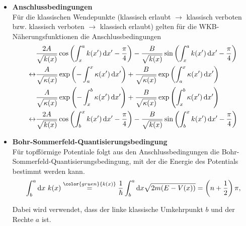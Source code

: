 \documentclass{article}
\newcommand{\diff}{\mathrm{d}}
\newcommand{\lr}[1]{\left(#1\right)}
\newcommand{\comment}[1]{{\color{gruen} {#1}}}
\begin{document}
	\begin{itemize}
		\item \textbf{Anschlussbedingungen}\\
		Für die klassischen Wendepunkte (klassisch erlaubt $\rightarrow$ klassisch verboten bzw. klassisch verboten $\rightarrow$ klassisch erlaubt) gelten für die WKB-Näherungsfunktionen die Anschlussbedingungen
			\begin{align}
				& \frac{2A}{\sqrt{k(x)}} \cos\lr{ \int_x^a k(x')\,\diff x' - \frac{\pi}{4} } - \frac{B}{\sqrt{k(x)}} \sin\lr{ \int_x^a k(x')\,\diff x' - \frac{\pi}{4} } \notag\\
				\leftrightarrow & \frac{A}{\sqrt{\kappa(x)}} \exp\lr{ -\int_a^x \kappa(x')\,\diff x' } + \frac{B}{\sqrt{\kappa(x)}} \exp\lr{ \int_a^x \kappa(x')\,\diff x' }\\
				& \frac{A}{\sqrt{\kappa(x)}} \exp\lr{ -\int_x^b \kappa(x')\,\diff x' } + \frac{B}{\sqrt{\kappa(x)}} \exp\lr{ \int_x^b \kappa(x')\,\diff x' } \notag \\
				\leftrightarrow & \frac{2A}{\sqrt{k(x)}} \cos\lr{ \int_b^x k(x')\,\diff x' - \frac{\pi}{4} } - \frac{B}{\sqrt{k(x)}} \sin\lr{ \int_b^x k(x')\,\diff x' - \frac{\pi}{4} }
			\end{align}
		
		
		
		\item \textbf{Bohr-Sommerfeld-Quantisierungsbedingung}\\
		Für topfförmige Potentiale folgt aus den Anschlussbedingungen die Bohr-Sommerfeld-Quanti\-sierungsbedingung, mit der die Energie des Potentials bestimmt werden kann.
			\begin{equation}
				\int_b^a \diff x\ k(x) \stackrel{\comment{k(x)}}{=} \frac{1}{\hbar}\int_b^a \diff x \sqrt{2m(E-V(x))} = \lr{n + \frac{1}{2}}\pi,
			\end{equation}

		\textcolor{gruen}{Dabei wird verwendet, dass der linke klassische Umkehrpunkt $b$ und der Rechte $a$ ist.}
	\end{itemize}


\newpage
\end{document}
